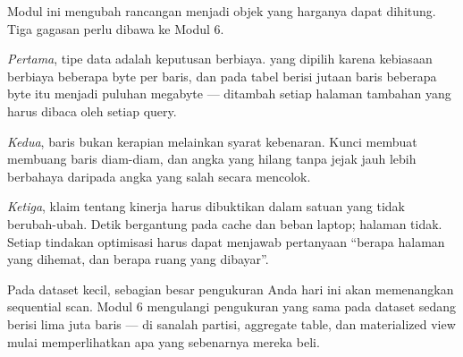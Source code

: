 Modul ini mengubah rancangan menjadi objek yang harganya dapat dihitung. Tiga
gagasan perlu dibawa ke Modul 6.

\emph{Pertama}, tipe data adalah keputusan berbiaya.  yang
dipilih karena kebiasaan berbiaya beberapa byte per baris, dan pada tabel
berisi jutaan baris beberapa byte itu menjadi puluhan megabyte --- ditambah
setiap halaman tambahan yang harus dibaca oleh setiap query.

\emph{Kedua}, baris  bukan kerapian melainkan syarat
kebenaran. Kunci  membuat  membuang baris
diam-diam, dan angka yang hilang tanpa jejak jauh lebih berbahaya daripada
angka yang salah secara mencolok.

\emph{Ketiga}, klaim tentang kinerja harus dibuktikan dalam satuan yang tidak
berubah-ubah. Detik bergantung pada cache dan beban laptop; halaman tidak.
Setiap tindakan optimisasi harus dapat menjawab pertanyaan ``berapa halaman
yang dihemat, dan berapa ruang yang dibayar''.

Pada dataset kecil, sebagian besar pengukuran Anda hari ini akan memenangkan
sequential scan. Modul 6 mengulangi pengukuran yang sama pada dataset sedang
berisi lima juta baris --- di sanalah partisi, aggregate table, dan
materialized view mulai memperlihatkan apa yang sebenarnya mereka beli.
